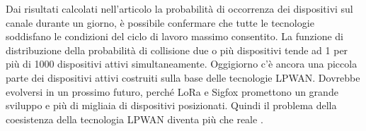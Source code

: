 \documentclass[a4paper]{report} %
\begin{document}
Dai risultati calcolati nell'articolo \cite{art:rif.46} la probabilità di occorrenza dei dispositivi sul canale durante un giorno, è possibile confermare che tutte le tecnologie soddisfano le condizioni del ciclo di lavoro massimo consentito. La funzione di distribuzione della probabilità di collisione due o più dispositivi tende ad 1 per più di 1000 dispositivi attivi simultaneamente. Oggigiorno c'è ancora una piccola parte dei dispositivi attivi costruiti sulla base delle tecnologie LPWAN. Dovrebbe evolversi in un prossimo futuro, perché LoRa e Sigfox promettono un grande sviluppo e più di migliaia di dispositivi posizionati. Quindi il problema della coesistenza della tecnologia LPWAN diventa più che reale \cite{art:rif.46}.
\end{document}
